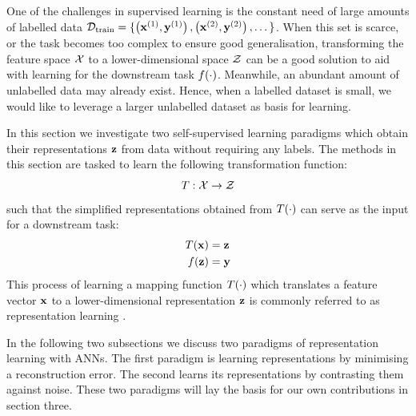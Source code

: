 
One of the challenges in supervised learning is the constant need of large amounts of labelled data $\mathcal{D}_{\text{train}} = \{ \left( \mathbf{x}^{(1)}, \mathbf{y}^{(1)} \right), \left( \mathbf{x}^{(2)}, \mathbf{y}^{(2)} \right), \dots \}$. When this set is scarce, or the task becomes too complex to ensure good generalisation, transforming the feature space $\mathcal{X}$ to a lower-dimensional space $\mathcal{Z}$ can be a good solution to aid with learning for the downstream task $f(\cdot)$. Meanwhile, an abundant amount of unlabelled data may already exist. Hence, when a labelled dataset is small, we would like to leverage a larger unlabelled dataset as basis for learning.

In this section we investigate two self-supervised learning paradigms which obtain their representations $\mathbf{z}$ from data without requiring any labels. The methods in this section are tasked to learn the following transformation function:
$$T: \mathcal{X} \rightarrow \mathcal{Z}$$
such that the simplified representations obtained from $T(\cdot)$ can serve as the input for a downstream task:
\begin{align*}
	T(\mathbf{x}) &=  \mathbf{z} \\
	f(\mathbf{z}) &= \mathbf{y} 
\end{align*}
This process of learning a mapping function $T(\cdot)$ which translates a feature vector $\mathbf{x}$ to a lower-dimensional representation $\mathbf{z}$ is commonly referred to as representation learning \cite{le-khacContrastiveRepresentationLearning2020}. 

In the following two subsections we discuss two paradigms of representation learning with ANNs. The first paradigm is learning representations by minimising a reconstruction error. The second learns its representations by contrasting them against noise. These two paradigms will lay the basis for our own contributions in section three.

